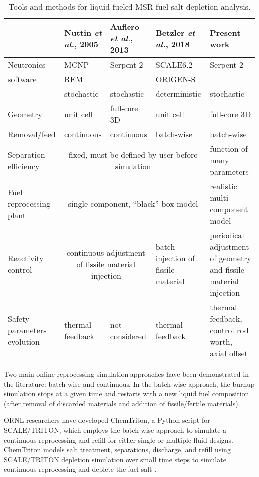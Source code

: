 \begin{table}[htbp]
	\fontsize{9}{11}\selectfont
	\caption{Tools and methods for liquid-fueled \gls{MSR} fuel salt 	
	depletion analysis.}
	\begin{tabularx}{\textwidth}{p{} p{} 	
	p{} p{} p{}} 
	\hline
	&Nuttin \emph{et al.}, 2005 \cite{nuttin_potential_2005}& Aufiero 
	\emph{et al.}, 2013 \cite{aufiero_extended_2013} & Betzler \emph{et al.}, 
	2018 \cite{betzler_fuel_2018}&Present work \\ \hline
	Neutronics&\gls{MCNP}&Serpent 2 &SCALE6.2     &Serpent 2 \\
	software  & REM      &          &ORIGEN-S     &			       \\
         	  &stochastic&stochastic&deterministic&stochastic      \\[10pt]
	Geometry  & unit cell& full-core 3D&unit cell&full-core 3D\\      [10pt]
	Removal/feed  & continuous &continuous & batch-wise & batch-wise\\[10pt]
	Separation efficiency &\multicolumn{3}{c}{fixed, must be defined by 
	user before simulation} & function of many para\-me\-ters \\ [10pt]
	Fuel reprocessing plant & \multicolumn{3}{c}{single component, 	``black'' 
	box model} & realistic multi-compo\-nent model \\ [10pt]
	Reactivity control & \multicolumn{2}{c}{continuous adjustment of fissile 
	material injection} & batch injection of fissile material & periodical 
		adjustment of geometry and fissile material injection\\ [10pt]
	Safety parameters evolution & thermal feedback & not considered & thermal 
	feedback & thermal feedback, control rod worth, axial offset \\
	\hline
	\end{tabularx}
	\label{tab:msr_codes}
\end{table}

Two main online reprocessing simulation approaches have been demonstrated in 
the literature: batch-wise and continuous. In the batch-wise approach, the 
burnup simulation stops at a given time and restarts with a new liquid fuel 
composition (after removal of discarded materials and addition of 
fissile/fertile materials). 

\gls{ORNL} researchers have developed ChemTriton, a Python script for
SCALE/TRITON, which employs the batch-wise approach to simulate a continuous 
reprocessing and refill for either single or multiple fluid designs.  
ChemTriton models salt treatment, separations, discharge, and refill using  
SCALE/TRITON depletion simulation over small time steps to simulate continuous 
reprocessing and deplete the fuel salt \cite{betzler_fuel_2018, 
powers_new_2013}.

